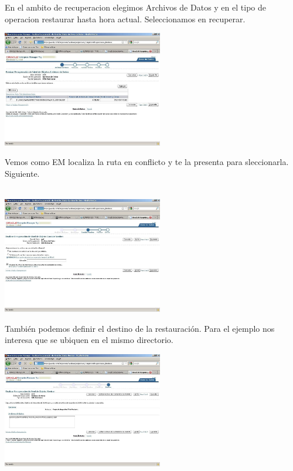 \documentclass[a4paper,twocolumn,10pt]{article}
\begin{document}
\begin{enumerate}[4.1]
\begin{center}
\end{center}
En el ambito de recuperacion elegimos Archivos de Datos y en el tipo de operacion restaurar hasta hora actual. Seleccionamos en recuperar.
\begin{center}
\includegraphics[width=7cm]{./Imagenes/r4} 
\end{center} 




\end{enumerate} 

         Vemos como EM localiza la ruta en conflicto y te la presenta para sleccionarla. Siguiente.\\ \\
          \begin{center}
          \includegraphics[width=7cm]{./Imagenes/recu_5.jpg}
          \end{center}
          \normalsize Tambi\'en podemos definir el destino de la restauraci\'on. Para el ejemplo  nos interesa que se ubiquen en el mismo directorio. \\ 

         \begin{center}
          \includegraphics[width=7cm]{./Imagenes/recu_6.jpg}
           \end{center}
\end{document}
